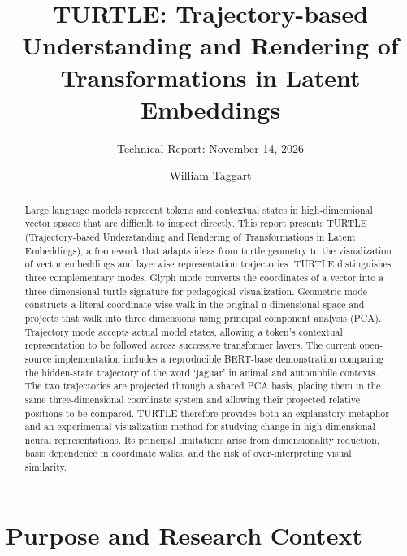 \documentclass[manuscript,screen,nonacm]{acmart}
\begin{document}
\title{TURTLE: Trajectory-based Understanding and Rendering of Transformations in Latent Embeddings}
\author{William Taggart}
\subtitle{Technical Report: November 14, 2026}
\begin{abstract}
Large language models represent tokens and contextual states in high-dimensional vector spaces that are difficult to inspect directly. This report presents TURTLE (Trajectory-based Understanding and Rendering of Transformations in Latent Embeddings), a framework that adapts ideas from turtle geometry to the visualization of vector embeddings and layerwise representation trajectories. TURTLE distinguishes three complementary modes. Glyph mode converts the coordinates of a vector into a three-dimensional turtle signature for pedagogical visualization. Geometric mode constructs a literal coordinate-wise walk in the original n-dimensional space and projects that walk into three dimensions using principal component analysis (PCA). Trajectory mode accepts actual model states, allowing a token's contextual representation to be followed across successive transformer layers. The current open-source implementation includes a reproducible BERT-base demonstration comparing the hidden-state trajectory of the word `jaguar' in animal and automobile contexts. The two trajectories are projected through a shared PCA basis, placing them in the same three-dimensional coordinate system and allowing their projected relative positions to be compared. TURTLE therefore provides both an explanatory metaphor and an experimental visualization method for studying change in high-dimensional neural representations. Its principal limitations arise from dimensionality reduction, basis dependence in coordinate walks, and the risk of over-interpreting visual similarity.

\end{abstract}
\maketitle
\section{Purpose and Research Context}\label{introduction}
\end{document}
